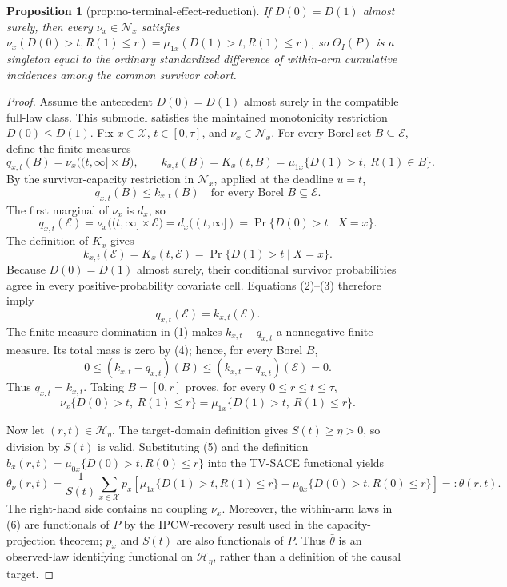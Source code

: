 \documentclass{article}
\newtheorem{proposition}{Proposition}
\begin{document}
\begin{proposition}[prop:no-terminal-effect-reduction]\label{prop:no-terminal-effect-reduction}
If \(D(0)=D(1)\) almost surely, then every \(\nu_x\in\mathcal N_x\) satisfies \(\nu_x(D(0)>t,R(1)\le r)=\mu_{1x}(D(1)>t,R(1)\le r)\), so \(\Theta_I(P)\) is a singleton equal to the ordinary standardized difference of within-arm cumulative incidences among the common survivor cohort.
\end{proposition}
\begin{proof}
Assume the antecedent \(D(0)=D(1)\) almost surely in the compatible full-law class.  This submodel satisfies the maintained monotonicity restriction \(D(0)\leq D(1)\).  Fix \(x\in\mathcal X\), \(t\in[0,\tau]\), and \(\nu_x\in\mathcal N_x\).  For every Borel set \(B\subseteq\mathcal E\), define the finite measures
\[
q_{x,t}(B)=\nu_x\bigl((t,\infty]\times B\bigr),
\qquad
k_{x,t}(B)=K_x(t,B)
=\mu_{1x}\{D(1)>t,\ R(1)\in B\}.
\]
By the survivor-capacity restriction in \(\mathcal N_x\), applied at the deadline \(u=t\),
\[
q_{x,t}(B)\leq k_{x,t}(B)
\quad\text{for every Borel }B\subseteq\mathcal E. \tag{1}
\]
The first marginal of \(\nu_x\) is \(d_x\), so
\[
q_{x,t}(\mathcal E)
=\nu_x\bigl((t,\infty]\times\mathcal E\bigr)
=d_x((t,\infty])
=\Pr\{D(0)>t\mid X=x\}. \tag{2}
\]
The definition of \(K_x\) gives
\[
k_{x,t}(\mathcal E)
=K_x(t,\mathcal E)
=\Pr\{D(1)>t\mid X=x\}. \tag{3}
\]
Because \(D(0)=D(1)\) almost surely, their conditional survivor probabilities agree in every positive-probability covariate cell.  Equations (2)--(3) therefore imply
\[
q_{x,t}(\mathcal E)=k_{x,t}(\mathcal E). \tag{4}
\]
The finite-measure domination in (1) makes \(k_{x,t}-q_{x,t}\) a nonnegative finite measure.  Its total mass is zero by (4); hence, for every Borel \(B\),
\[
0\leq (k_{x,t}-q_{x,t})(B)
\leq (k_{x,t}-q_{x,t})(\mathcal E)=0.
\]
Thus \(q_{x,t}=k_{x,t}\).  Taking \(B=[0,r]\) proves, for every \(0\leq r\leq t\leq\tau\),
\[
\nu_x\{D(0)>t,\ R(1)\leq r\}
=\mu_{1x}\{D(1)>t,\ R(1)\leq r\}. \tag{5}
\]

Now let \((r,t)\in\mathcal H_\eta\).  The target-domain definition gives \(S(t)\geq\eta>0\), so division by \(S(t)\) is valid.  Substituting (5) and the definition
\(b_x(r,t)=\mu_{0x}\{D(0)>t,R(0)\leq r\}\) into the TV-SACE functional yields
\[
\theta_\nu(r,t)
=\frac{1}{S(t)}\sum_{x\in\mathcal X}p_x
\left[
\mu_{1x}\{D(1)>t,R(1)\leq r\}
-\mu_{0x}\{D(0)>t,R(0)\leq r\}
\right]
=:\bar\theta(r,t). \tag{6}
\]
The right-hand side contains no coupling \(\nu_x\).  Moreover, the within-arm laws in (6) are functionals of \(P\) by the IPCW-recovery result used in the capacity-projection theorem; \(p_x\) and \(S(t)\) are also functionals of \(P\).  Thus \(\bar\theta\) is an observed-law identifying functional on \(\mathcal H_\eta\), rather than a definition of the causal target.


\end{proof}
\end{document}
